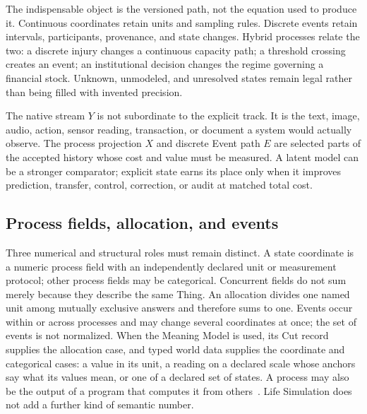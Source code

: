 \documentclass[10pt]{article}
\begin{document}
The indispensable object is the versioned path, not the equation used to
produce it. Continuous coordinates retain units and sampling rules. Discrete
events retain intervals, participants, provenance, and state changes. Hybrid
processes relate the two: a discrete injury changes a continuous capacity path;
a threshold crossing creates an event; an institutional decision changes the
regime governing a financial stock. Unknown, unmodeled, and unresolved states
remain legal rather than being filled with invented precision.

The native stream $Y$ is not subordinate to the explicit track. It is the text,
image, audio, action, sensor reading, transaction, or document a system would
actually observe. The process projection $X$ and discrete Event path $E$ are
selected parts of the accepted history whose cost and value must be measured. A latent model can be a
stronger comparator; explicit state earns its place only when it improves
prediction, transfer, control, correction, or audit at matched total cost.

\subsection{Process fields, allocation, and events}

Three numerical and structural roles must remain distinct. A state coordinate
is a numeric process field with an independently declared unit or measurement
protocol; other process fields may be categorical. Concurrent fields do not
sum merely because they describe the same Thing. An allocation divides one
named unit among mutually exclusive
answers and therefore sums to one. Events occur within or across processes and
may change several coordinates at once; the set of events is not normalized.
When the Meaning Model is used, its Cut record supplies the allocation case,
and typed world data supplies the coordinate and categorical cases: a value in
its unit, a reading on a declared scale whose anchors say what its values mean,
or one of a declared set of states. A process may also be the output of a
program that computes it from others~\cite{westerbergMeaning2026}. Life
Simulation does not add a further kind of semantic number.
\end{document}
